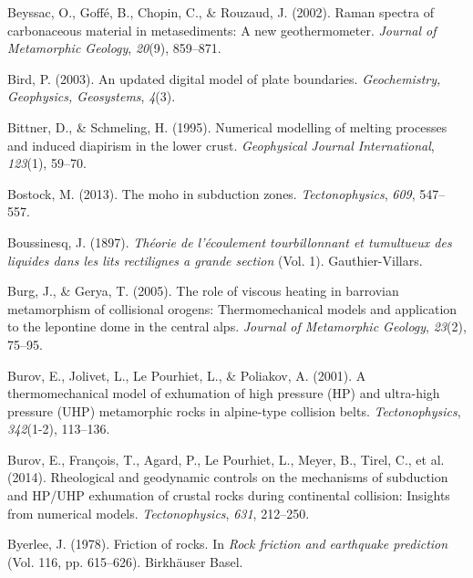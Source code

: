 \begin{CSLReferences}{1}{1}
\leavevmode{}%
Beyssac, O., Goffé, B., Chopin, C., \& Rouzaud, J. (2002). Raman spectra of carbonaceous material in metasediments: A new geothermometer. \emph{Journal of Metamorphic Geology}, \emph{20}(9), 859--871.

\leavevmode{}%
Bird, P. (2003). An updated digital model of plate boundaries. \emph{Geochemistry, Geophysics, Geosystems}, \emph{4}(3).

\leavevmode{}%
Bittner, D., \& Schmeling, H. (1995). Numerical modelling of melting processes and induced diapirism in the lower crust. \emph{Geophysical Journal International}, \emph{123}(1), 59--70.

\leavevmode{}%
Bostock, M. (2013). The moho in subduction zones. \emph{Tectonophysics}, \emph{609}, 547--557.

\leavevmode{}%
Boussinesq, J. (1897). \emph{Th{é}orie de l'{é}coulement tourbillonnant et tumultueux des liquides dans les lits rectilignes a grande section} (Vol. 1). Gauthier-Villars.

\leavevmode{}%
Burg, J., \& Gerya, T. (2005). The role of viscous heating in barrovian metamorphism of collisional orogens: Thermomechanical models and application to the lepontine dome in the central alps. \emph{Journal of Metamorphic Geology}, \emph{23}(2), 75--95.

\leavevmode{}%
Burov, E., Jolivet, L., Le Pourhiet, L., \& Poliakov, A. (2001). A thermomechanical model of exhumation of high pressure (HP) and ultra-high pressure (UHP) metamorphic rocks in alpine-type collision belts. \emph{Tectonophysics}, \emph{342}(1-2), 113--136.

\leavevmode{}%
Burov, E., François, T., Agard, P., Le Pourhiet, L., Meyer, B., Tirel, C., et al. (2014). Rheological and geodynamic controls on the mechanisms of subduction and HP/UHP exhumation of crustal rocks during continental collision: Insights from numerical models. \emph{Tectonophysics}, \emph{631}, 212--250.

\leavevmode{}%
Byerlee, J. (1978). Friction of rocks. In \emph{Rock friction and earthquake prediction} (Vol. 116, pp. 615--626). Birkh{ä}user Basel.


\end{CSLReferences}
